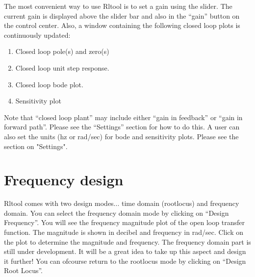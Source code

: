 The most convenient way to use Rltool is to set a gain using the
slider. The current gain is displayed above the slider bar and also in
the ``gain'' button on the control center. Also, a window containing
the following closed loop plots is continuously updated:
\begin{enumerate}
   \item Closed loop pole(s) and zero(s)
   \item Closed loop unit step response.
   \item Closed loop bode plot.
   \item Sensitivity plot
\end{enumerate}
Note that ``closed loop plant'' may include either ``gain in feedback'' or
``gain in forward path''. Please see the ``Settings'' section for how to
do this. A user can also set the units (hz or rad/sec) for  bode and
sensitivity plots. Please see the section on "Settings". 



\section{Frequency design}
Rltool comes with two design modes... time domain (rootlocus) and
frequency domain. You can select the frequency domain mode by clicking
on ``Design \rar Frequency''. You will see the frequency magnitude plot
of the open loop transfer function. The magnitude is shown in decibel
and frequency in rad/sec. Click on the plot to determine the magnitude
and frequency. The frequency domain part is still under
development. It will be a great idea to take up this aspect and design
it further! You can ofcourse return to the rootlocus mode by clicking
on ``Design \rar  Root Locus''.
